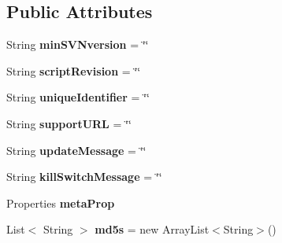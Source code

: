 \subsection*{Public Attributes}
\begin{DoxyCompactItemize}
\item 
\hypertarget{classCASUAL_1_1caspac_1_1Script_1_1meta_ae1e5528a05bcf7cbc7f368017a7e7ab7}{String {\bfseries min\-S\-V\-Nversion} = \char`\"{}\char`\"{}}\label{classCASUAL_1_1caspac_1_1Script_1_1meta_ae1e5528a05bcf7cbc7f368017a7e7ab7}

\item 
\hypertarget{classCASUAL_1_1caspac_1_1Script_1_1meta_a1a3e2319baaf7bb61c7eaaf6b1171a2f}{String {\bfseries script\-Revision} = \char`\"{}\char`\"{}}\label{classCASUAL_1_1caspac_1_1Script_1_1meta_a1a3e2319baaf7bb61c7eaaf6b1171a2f}

\item 
\hypertarget{classCASUAL_1_1caspac_1_1Script_1_1meta_a66dee5c26c32cfdf3946df4cc196e433}{String {\bfseries unique\-Identifier} = \char`\"{}\char`\"{}}\label{classCASUAL_1_1caspac_1_1Script_1_1meta_a66dee5c26c32cfdf3946df4cc196e433}

\item 
\hypertarget{classCASUAL_1_1caspac_1_1Script_1_1meta_a071a5d2bbbebdb096a336741a86bd1a1}{String {\bfseries support\-U\-R\-L} = \char`\"{}\char`\"{}}\label{classCASUAL_1_1caspac_1_1Script_1_1meta_a071a5d2bbbebdb096a336741a86bd1a1}

\item 
\hypertarget{classCASUAL_1_1caspac_1_1Script_1_1meta_a4b493e05ac7a0fa575a524b9caa22de9}{String {\bfseries update\-Message} = \char`\"{}\char`\"{}}\label{classCASUAL_1_1caspac_1_1Script_1_1meta_a4b493e05ac7a0fa575a524b9caa22de9}

\item 
\hypertarget{classCASUAL_1_1caspac_1_1Script_1_1meta_ac2d935e89f56476aa42981a2f5234006}{String {\bfseries kill\-Switch\-Message} = \char`\"{}\char`\"{}}\label{classCASUAL_1_1caspac_1_1Script_1_1meta_ac2d935e89f56476aa42981a2f5234006}

\item 
\hypertarget{classCASUAL_1_1caspac_1_1Script_1_1meta_a7ac1b9733ee7c804910d73774d4c4fdd}{Properties {\bfseries meta\-Prop}}\label{classCASUAL_1_1caspac_1_1Script_1_1meta_a7ac1b9733ee7c804910d73774d4c4fdd}

\item 
\hypertarget{classCASUAL_1_1caspac_1_1Script_1_1meta_a168fec9801221d6f93058c8c254f3747}{List$<$ String $>$ {\bfseries md5s} = new Array\-List$<$String$>$()}\label{classCASUAL_1_1caspac_1_1Script_1_1meta_a168fec9801221d6f93058c8c254f3747}

\end{DoxyCompactItemize}


